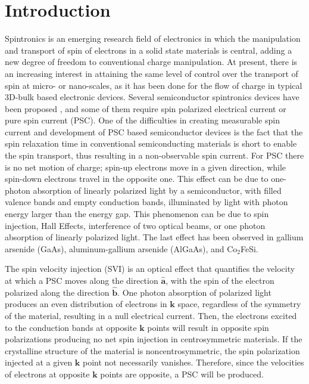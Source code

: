 \documentclass[floatfix,prb,aps,superscriptaddress,showpacs,11pt,preprint,letterpaper]{revtex4}
\begin{document}
\section{Introduction}
\label{sec:introduction}

Spintronics is an emerging research field of electronics in which the
manipulation and transport of spin of electrons in a solid state materials  is
central, adding a new degree of freedom to conventional charge
manipulation.\cite{wolfSC04,fabianAPS07} At present, there is an increasing
interest in attaining the same level of control over the transport of spin at
micro- or nano-scales, as it has been done for the flow of charge in typical
3D-bulk based electronic devices.\cite{awschalomNP2007} Several semiconductor
spintronics devices have been proposed \cite{majumdarAPL06,
dattaAPL90,gotteNat16,pershinPRB08}, and some of them require spin polarized
electrical current \cite{awschalomSSBM13} or pure spin current (PSC). One of
the difficulties in creating measurable  spin current and
development of PSC based semiconductor devices is the fact that the spin
relaxation time in conventional semiconducting materials is short to enable the
spin transport, thus resulting in a non-observable spin
current.\cite{murakamiSc03} For PSC there is no net motion of charge; spin-up
electrons move in a given direction, while spin-down electrons travel in the
opposite one. This effect can be due to one-photon absorption of linearly
polarized light by a semiconductor, with filled valence bands and empty
conduction bands, illuminated by light with photon energy larger than the
energy gap. This phenomenon can be due to spin injection,\cite{malPRB03} Hall
Effects,\cite{sinovaPRB04} interference of two optical beams,\cite{bhatPRL00,
najmaiePRB03} or one photon absorption of linearly polarized
light\cite{bhatPRL05}. The last effect has been observed in gallium arsenide
(GaAs),\cite{zhaoPRL2006, stevensPRL03} aluminum-gallium arsenide
(AlGaAs),\cite{stevensPRL03} and Co$_2$FeSi.\cite{kimuraNGPAM12}

The spin velocity injection (SVI) is an optical effect that quantifies the velocity at which
a PSC moves along the direction $\hat{\mathbf{a}}$, 
with the spin of the electron polarized along the direction $\hat{\mathbf{b}}$.
One photon absorption of polarized
light produces an even distribution of electrons in $\mathbf{k}$
space, regardless of the symmetry of the material, resulting in a null
electrical current.\cite{bhatPRL05} 
Then, the electrons excited to the
conduction bands at opposite $\mathbf{k}$ points will result in opposite spin
polarizations producing no net spin injection in centrosymmetric 
materials.\cite{bhatPRL05} 
If the crystalline structure of the material
is noncentrosymmetric, the spin polarization injected at a given $\mathbf{k}$
point not necessarily vanishes.\cite{alvaradoPRL85,schmiedeskampPRL88}
Therefore, since the velocities of electrons at opposite $\mathbf{k}$ points
are opposite, a PSC will be produced. 
\end{document}
